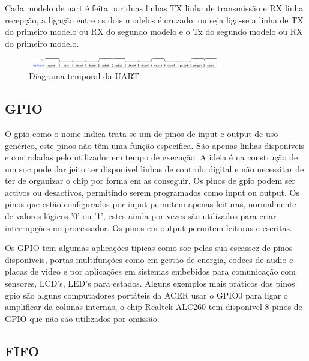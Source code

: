 Cada modelo de uart é feita por duas linhas TX linha de transmissão e RX linha recepção, a ligação entre os dois modelos é cruzado, ou seja liga-se a linha de TX do primeiro modelo ou RX do segundo modelo e o Tx do segundo modelo ou RX do primeiro modelo.

\begin{figure}[!htb]
  \centering
  \includegraphics[width=0.75\textwidth]{ondas/uart.pdf} %
  \caption[Diagrama temporal da UART]{Diagrama temporal da UART}
  \label{fig:uart}
\end{figure}

\subsection{GPIO}

O \acrlong{gpio} como o nome indica trata-se um de pinos de input e output de uso genérico, este pinos não têm uma função especifica. São apenas linhas disponíveis e controladas pelo utilizador em tempo de execução. A ideia é na construção de um \acrshort{soc} pode dar jeito ter disponível linhas de controlo digital e não necessitar de ter de organizar o chip por forma em as conseguir. Os pinos de \acrshort{gpio} podem ser activos ou desactivos, permitindo serem programados como input ou output. Os pinos que estão configurados por input permitem apenas leituras, normalmente de valores lógicos '0' ou '1', estes ainda por vezes são utilizados para criar interrupções no processador. Os pinos em output permitem leituras e escritas.

Os GPIO tem algumas aplicações tipicas como \acrshort{soc} pelas sua escassez de pinos disponíveis, portas multifunções como em gestão de energia, codecs de audio e placas de video e por aplicações em sistemas embebidos para comunicação com sensores, LCD's, LED's para estados. Alguns exemplos mais práticos dos pinos \acrshort{gpio} são alguns computadores portáteis da ACER usar o GPIO0 para ligar o amplificar da colunas internas, o chip Realtek ALC260 tem disponivel 8 pinos de GPIO que não são utilizados por omissão.


\subsection{FIFO}

